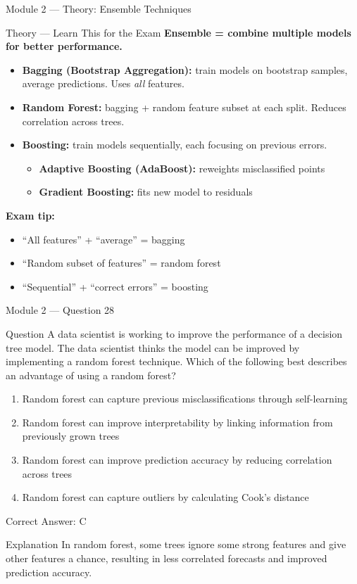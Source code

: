 \documentclass[aspectratio=169,10pt]{beamer}
\newcommand{\question}[1]{%
	\begin{block}{Question}
		#1
	\end{block}
}
\newcommand{\options}[4]{%
	\begin{enumerate}[label=\Alph*.,leftmargin=*]
		\item #1
		\item #2
		\item #3
		\item #4
	\end{enumerate}
}
\newcommand{\answerbox}[1]{%
	\begin{exampleblock}{Correct Answer: #1}
	\end{exampleblock}
}
\newcommand{\explain}[1]{%
	\begin{block}{Explanation}
		\small #1
	\end{block}
}
\newcommand{\theory}[1]{%
	\begin{block}{Theory --- Learn This for the Exam}
		\small #1
	\end{block}
}
\begin{document}
	\begin{frame}{Module 2 --- Theory: Ensemble Techniques}
		\theory{
			\textbf{Ensemble = combine multiple models for better performance.}
			\begin{itemize}
				\item \textbf{Bagging (Bootstrap Aggregation):} train models on bootstrap samples, average predictions. Uses \emph{all} features.
				\item \textbf{Random Forest:} bagging + random feature subset at each split. Reduces correlation across trees.
				\item \textbf{Boosting:} train models sequentially, each focusing on previous errors.
				\begin{itemize}
					\item \textbf{Adaptive Boosting (AdaBoost):} reweights misclassified points
					\item \textbf{Gradient Boosting:} fits new model to residuals
				\end{itemize}
			\end{itemize}
			\textbf{Exam tip:}
			\begin{itemize}
				\item ``All features'' + ``average'' = bagging
				\item ``Random subset of features'' = random forest
				\item ``Sequential'' + ``correct errors'' = boosting
			\end{itemize}
		}
	\end{frame}
	
	\begin{frame}{Module 2 --- Question 28}
		\question{A data scientist is working to improve the performance of a decision tree model. The data scientist thinks the model can be improved by implementing a random forest technique. Which of the following best describes an advantage of using a random forest?}
		\options{Random forest can capture previous misclassifications through self-learning}{Random forest can improve interpretability by linking information from previously grown trees}{Random forest can improve prediction accuracy by reducing correlation across trees}{Random forest can capture outliers by calculating Cook's distance}
		\answerbox{C}
		\explain{In random forest, some trees ignore some strong features and give other features a chance, resulting in less correlated forecasts and improved prediction accuracy.}
	\end{frame}
	
\end{document}
